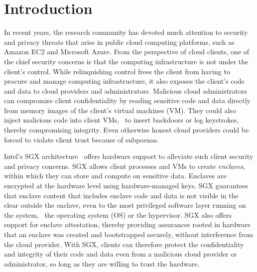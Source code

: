 \section{Introduction}
\label{section:introduction}

In recent years, the research community has devoted much attention to security
and privacy threats that arise in public cloud computing platforms, such as
Amazon EC2 and Microsoft Azure. From the perspective of cloud clients, one of
the chief security concerns is that the computing infrastructure is not under
the client's control. While relinquishing control frees the client from having
to procure and manage computing infrastructure, it also exposes the client's
code and data to cloud providers and administrators. Malicious cloud
administrators can compromise client confidentiality by reading sensitive code
and data directly from memory images of the client's virtual machines (VM).
They could also inject malicious code into client VMs, \eg~to insert backdoors
or log keystrokes, thereby compromising integrity. Even otherwise honest cloud
providers could be forced to violate client trust because of subpoenas.

Intel's SGX
architecture~\cite{sgx:attest:hasp13,sgx:instructions:hasp13,sgx:isolated:hasp13,intelsgx:sep13,intelsgx:oct14}
offers hardware support to alleviate such client security and privacy concerns.
SGX allows client processes and VMs to create \textit{enclaves}, within which
they can store and compute on sensitive data.  Enclaves are encrypted at the
hardware level using hardware-managed keys. SGX guarantees that enclave content that includes enclave code and data is not visible in the clear outside the enclave, even to the most privileged
software layer running on the system, \ie~the operating system (OS) or the
hypervisor. SGX also offers support for enclave attestation, thereby providing
assurances rooted in hardware that an enclave was created and bootstrapped
securely, without interference from the cloud provider.  With SGX, clients can
therefore protect the confidentiality and integrity of their code and data even
from a malicious cloud provider or administrator, so long as they are willing
to trust the hardware.

